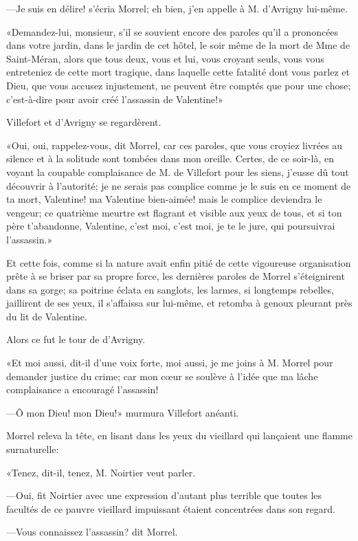 —Je suis en délire! s'écria Morrel; eh bien, j'en appelle à M. d'Avrigny lui-même. 

«Demandez-lui, monsieur, s'il se souvient encore des paroles qu'il a prononcées dans votre jardin, dans le jardin de cet hôtel, le soir même de la mort de Mme de Saint-Méran, alors que tous deux, vous et lui, vous croyant seuls, vous vous entreteniez de cette mort tragique, dans laquelle cette fatalité dont vous parlez et Dieu, que vous accusez injustement, ne peuvent être comptés que pour une chose; c'est-à-dire pour avoir créé l'assassin de Valentine!» 

Villefort et d'Avrigny se regardèrent. 

«Oui, oui, rappelez-vous, dit Morrel, car ces paroles, que vous croyiez livrées au silence et à la solitude sont tombées dans mon oreille. Certes, de ce soir-là, en voyant la coupable complaisance de M. de Villefort pour les siens, j'eusse dû tout découvrir à l'autorité; je ne serais pas complice comme je le suis en ce moment de ta mort, Valentine! ma Valentine bien-aimée! mais le complice deviendra le vengeur; ce quatrième meurtre est flagrant et visible aux yeux de tous, et si ton père t'abandonne, Valentine, c'est moi, c'est moi, je te le jure, qui poursuivrai l'assassin.» 

Et cette fois, comme si la nature avait enfin pitié de cette vigoureuse organisation prête à se briser par sa propre force, les dernières paroles de Morrel s'éteignirent dans sa gorge; sa poitrine éclata en sanglots, les larmes, si longtemps rebelles, jaillirent de ses yeux, il s'affaissa sur lui-même, et retomba à genoux pleurant près du lit de Valentine. 

Alors ce fut le tour de d'Avrigny. 

«Et moi aussi, dit-il d'une voix forte, moi aussi, je me joins à M. Morrel pour demander justice du crime; car mon cœur se soulève à l'idée que ma lâche complaisance a encouragé l'assassin! 

—Ô mon Dieu! mon Dieu!» murmura Villefort anéanti. 

Morrel releva la tête, en lisant dans les yeux du vieillard qui lançaient une flamme surnaturelle: 

«Tenez, dit-il, tenez, M. Noirtier veut parler. 

—Oui, fit Noirtier avec une expression d'autant plus terrible que toutes les facultés de ce pauvre vieillard impuissant étaient concentrées dans son regard. 

—Vous connaissez l'assassin? dit Morrel. 

